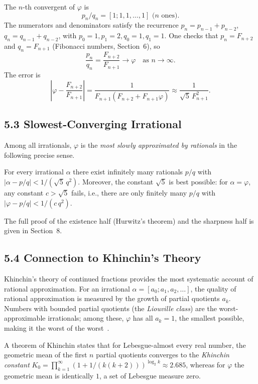 The $n$-th convergent of $\varphi$ is
\[
  p_n/q_n = [1;1,1,\ldots,1]\text{ ($n$ ones)}.
\]
The numerators and denominators satisfy the
recurrence $p_n = p_{n-1} + p_{n-2}$,
$q_n = q_{n-1} + q_{n-2}$, with
$p_0 = 1, p_1 = 2, q_0 = 1, q_1 = 1$.
One checks that $p_n = F_{n+2}$ and $q_n = F_{n+1}$
(Fibonacci numbers, Section~6), so
\[
  \frac{p_n}{q_n} = \frac{F_{n+2}}{F_{n+1}} \to \varphi
  \quad\text{as }n\to\infty.
\]
The error is
\[
  \left|\varphi - \frac{F_{n+2}}{F_{n+1}}\right|
  = \frac{1}{F_{n+1}(F_{n+2} + F_{n+1}\varphi)}
  \approx \frac{1}{\sqrt{5}\,F_{n+1}^2}.
\]

\subsection{5.3 Slowest-Converging Irrational}
\label{subsec:gc-slowest}

Among all irrationals, $\varphi$ is the
\emph{most slowly approximated by rationals}
in the following precise sense.

\begin{theorem}
\label{thm:gc-hurwitz-lagrange}
For every irrational $\alpha$ there exist infinitely
many rationals $p/q$ with
$|\alpha - p/q| < 1/(\sqrt{5}\,q^2)$.
Moreover, the constant $\sqrt{5}$ is best possible:
for $\alpha = \varphi$, any constant $c > \sqrt{5}$
fails, i.e., there are only finitely many $p/q$ with
$|\varphi - p/q| < 1/(c\,q^2)$.
\end{theorem}

The full proof of the existence half (Hurwitz's theorem)
and the sharpness half is given in Section~8.

\subsection{5.4 Connection to Khinchin's Theory}
\label{subsec:gc-khinchin}

Khinchin's theory of continued fractions provides the
most systematic account of rational approximation.
For an irrational $\alpha = [a_0; a_1, a_2, \ldots]$,
the quality of rational approximation is measured by
the growth of partial quotients $a_k$.
Numbers with bounded partial quotients (the
\emph{Liouville class}) are the worst-approximable
irrationals; among these, $\varphi$ has all
$a_k = 1$, the smallest possible, making it the
worst of the worst~\cite{khinchin_continued_fractions}.

A theorem of Khinchin states that for Lebesgue-almost
every real number, the geometric mean of the first $n$
partial quotients converges to the
\emph{Khinchin constant}
$K_0 = \prod_{k=1}^{\infty}(1+1/(k(k+2)))^{\log_2 k}
\approx 2.685$,
whereas for $\varphi$ the geometric mean is identically
$1$, a set of Lebesgue measure zero.

